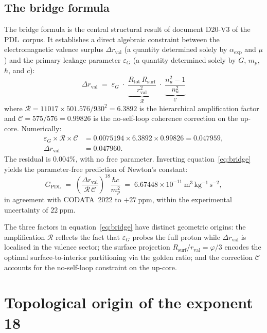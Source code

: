 \documentclass[11pt,a4paper]{article}
\theoremstyle{definition}
\newcommand{\PDL}{\textnormal{PDL}}
\newcommand{\Rsurf}{R_{\mathrm{surf}}}
\newcommand{\Rtot}{R_{\mathrm{tot}}}
\newcommand{\rval}{r_{\mathrm{val}}}
\newcommand{\epsg}{\varepsilon_G}
\newcommand{\calR}{\mathcal{R}}
\newcommand{\calC}{\mathcal{C}}
\newcommand{\vp}{\varphi}
\newcommand{\GPDL}{G_{\mathrm{PDL}}}
\begin{document}
\subsection{The bridge formula}
\label{subsec:bridge}

The bridge formula is the central structural result of document D20-V3 of the \PDL\ corpus.\cite{Bridge_Formula_PDL_2026} It establishes a direct algebraic constraint between the electromagnetic valence surplus $\Delta\rval$ (a quantity determined solely by $\alpha_{\exp}$ and $\mu$) and the primary leakage parameter $\epsg$ (a quantity determined solely by $G$, $m_p$, $\hbar$, and $c$):
\begin{equation}
  \label{eq:bridge}
  \boxed{\Delta\rval \;=\; \epsg \;\cdot\; \underbrace{\frac{\Rtot\,\Rsurf}{\rval^2}}_{\calR} \;\cdot\; \underbrace{\frac{n_u^2-1}{n_u^2}}_{\calC}}
\end{equation}
where $\calR = 11017 \times 501.576/930^2 = 6.3892$ is the hierarchical amplification factor and $\calC = 575/576 = 0.99826$ is the no-self-loop coherence correction on the up-core. Numerically:
\begin{align*}
  \epsg \times \calR \times \calC &= 0.0075194 \times 6.3892 \times 0.99826 = 0.047959, \\
  \Delta\rval &= 0.047960.
\end{align*}
The residual is $0.004\%$, with no free parameter. Inverting equation~\eqref{eq:bridge} yields the parameter-free prediction of Newton's constant:
\begin{equation}
  \label{eq:G_PDL}
  \GPDL \;=\; \left(\frac{\Delta\rval}{\calR\,\calC}\right)^{18} \frac{\hbar c}{m_p^2} \;=\; 6.67448\times 10^{-11}\ \mathrm{m^3\,kg^{-1}\,s^{-2}},
\end{equation}
in agreement with CODATA~2022 to $+27\ \mathrm{ppm}$, within the experimental uncertainty of $22\ \mathrm{ppm}$.

The three factors in equation~\eqref{eq:bridge} have distinct geometric origins: the amplification $\calR$ reflects the fact that $\epsg$ probes the full proton while $\Delta\rval$ is localised in the valence sector; the surface projection $\Rsurf/\rval = \vp/3$ encodes the optimal surface-to-interior partitioning via the golden ratio; and the correction $\calC$ accounts for the no-self-loop constraint on the up-core.

\section{Topological origin of the exponent 18}
\label{sec:exponent18}
\end{document}
